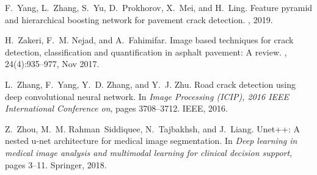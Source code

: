 \documentclass[twocolumn]{article}
\begin{document}
\begin{thebibliography}{10}
F.~Yang, L.~Zhang, S.~Yu, D.~Prokhorov, X.~Mei, and H.~Ling.
\newblock Feature pyramid and hierarchical boosting network for pavement crack
  detection.
, 2019.

H.~Zakeri, F.~M. Nejad, and A.~Fahimifar.
\newblock Image based techniques for crack detection, classification and
  quantification in asphalt pavement: A review.
,
  24(4):935--977, Nov 2017.

L.~Zhang, F.~Yang, Y.~D. Zhang, and Y.~J. Zhu.
\newblock Road crack detection using deep convolutional neural network.
\newblock In {\em Image Processing (ICIP), 2016 IEEE International Conference
  on}, pages 3708--3712. IEEE, 2016.

Z.~Zhou, M.~M. Rahman~Siddiquee, N.~Tajbakhsh, and J.~Liang.
\newblock Unet++: A nested u-net architecture for medical image segmentation.
\newblock In {\em Deep learning in medical image analysis and multimodal
  learning for clinical decision support}, pages 3--11. Springer, 2018.

\end{thebibliography}
\end{document}
